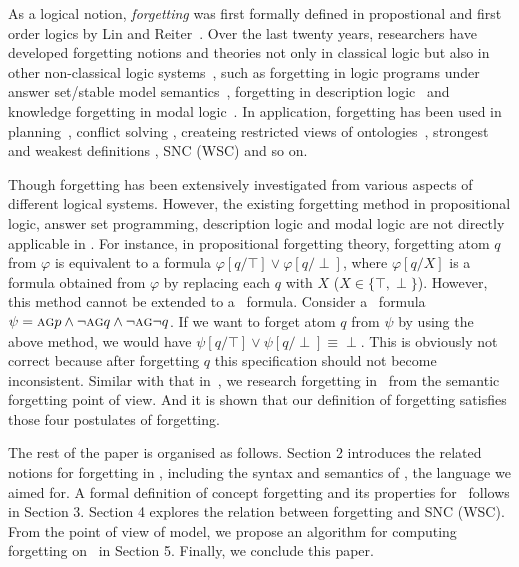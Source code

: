 \documentclass{article}
\begin{document}
As a logical notion, \emph{forgetting} was first formally defined
in propostional and first order logics by Lin and Reiter~\cite{lin1994forget}.
Over the last twenty years, researchers have developed forgetting notions and theories not only in classical logic but also in other non-classical logic systems~\cite{eiter2019brief}, such as forgetting in logic programs under answer set/stable model semantics~\cite{DBLP:Zhang:AIJ2006,Eiter2008Semantic,Wong:PhD:Thesis,Yisong:KR:2012,Yisong:IJCAI:2013}, forgetting in description logic~\cite{Wang:AMAI:2010,Lutz:IJCAI:2011,zhao2017role} and knowledge forgetting in modal logic~\cite{Yan:AIJ:2009,Kaile:JAIR:2009,Yongmei:IJCAI:2011,fang2019forgetting}. In application, forgetting has been used in planning~\cite{lin2003compiling},  conflict solving \cite{Lang2010Reasoning,Zhang2005Solving},
createing restricted views of ontologies~\cite{zhao2017role},
strongest and weakest definitions \cite{Lang2008On}, SNC (WSC) \cite{DBLP:journals/ai/Lin01} and so on.


Though forgetting has been extensively investigated from various aspects of different logical systems.
However, the existing forgetting method in propositional
logic, answer set programming, description logic and modal logic are not directly applicable in \CTL.
For instance, in propositional forgetting theory, forgetting atom $q$ from $\varphi$ is equivalent to a formula $\varphi[q/\top] \vee \varphi[q/\perp]$, where $\varphi[q/X]$ is a formula obtained from $\varphi$ by replacing each $q$ with $X$ ($X\in \{\top, \perp\}$).
However, this method cannot be extended to a \CTL\ formula. Consider a \CTL\ formula $\psi=\textsc{a}\textsc{g} p \wedge \neg \textsc{a}\textsc{g} q \wedge \neg \textsc{a}\textsc{g} \neg q$. If we want to forget
atom $q$ from $\psi$ by using the above method, we would have $\psi[q/\top] \vee \psi[q/\perp] \equiv \perp$. This is obviously not correct because after forgetting $q$ this specification should
not become inconsistent.
Similar with that in~\cite{Yan:AIJ:2009}, we research forgetting in \CTL\ from the semantic forgetting point of view.
And it is shown that our definition of forgetting satisfies those four postulates of forgetting.

The rest of the paper is organised as follows. Section 2 introduces the related notions for forgetting in \CTL, including the syntax and semantics of \CTL, the language we aimed for.
A formal definition of concept forgetting and its properties for \CTL\ follows in Section 3.
Section 4 explores the relation between forgetting and SNC (WSC).
From the point of view of model, we propose an algorithm for computing forgetting on \CTL\ in Section 5.
Finally, we conclude this paper.
\end{document}
